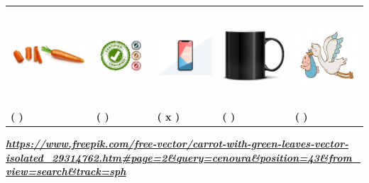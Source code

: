 \begin{longtable}[]{@{}lllll@{}}
\toprule
\includegraphics[width=1.36272in,height=0.72875in]{media/image105.jpg} &
\includegraphics[width=0.90977in,height=1.00720in]{media/image106.jpg} &
\includegraphics[width=0.98256in,height=1.40209in]{media/image107.jpg} &
\includegraphics[width=1.12500in,height=1.12500in]{media/image108.jpg} &
\includegraphics[width=1.13713in,height=1.09392in]{media/image109.jpg}\tabularnewline
\textbf{( ) } & \textbf{( )} & \textbf{( x ) } & \textbf{( ) } &
\textbf{( ) }\tabularnewline
\bottomrule
\end{longtable}

\href{https://www.freepik.com/free-vector/carrot-with-green-leaves-vector-isolated_29314762.htm\#page=2\&query=cenoura\&position=43\&from_view=search\&track=sph}{\textbf{\emph{https://www.freepik.com/free-vector/carrot-with-green-leaves-vector-isolated\_29314762.htm\#page=2\&query=cenoura\&position=43\&from\_view=search\&track=sph}}}

